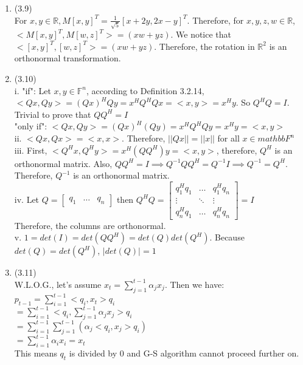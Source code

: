 \documentclass[letterpaper,12pt]{article}
\theoremstyle{definition}
\begin{document}
\begin{enumerate}
	
	\item(3.9)\\
	For $x, y \in  \mathbb{R}, M[x, y]^T = \frac{1}{\sqrt{5}}[x+2y, 2x-y]^T$. Therefore, for $x, y, z, w \in  \mathbb{R}$,  $<M[x, y]^T, M[w, z]^T> = (xw +yz)$. We notice that $<[x, y]^T,[w, z]^T> = (xw +yz) $. Therefore, the rotation in $\mathbb{R}^2$ is an orthonormal transformation.\\

	\item(3.10)\\
	i. "if": Let $x, y \in \mathbb{F}^{n}$, according to Definition 3.2.14, $<Qx, Qy> = (Qx)^{H}Qy = x^{H}Q^{H}Qx = <x, y> = x^{H}y$. So $Q^{H}Q = I$. Trivial to prove that $QQ^{H} = I$\\
	   "only if": $<Qx, Qy> = (Qx)^{H}(Qy) = x^{H}Q^{H}Qy = x^{H}y = <x, y>$\\
	ii. $<Qx, Qx> = <x,x>$. Therefore, $||Qx|| = ||x||$ for all $x \in mathbb{F}^{n}$\\
	iii. First, $<Q^{H}x, Q^{H}y> = x^{H}(QQ^{H})y = <x, y>$, therefore, $Q^{H}$ is an orthonormal matrix. Also, $QQ^{H} = I \implies Q^{-1}QQ^{H} = Q^{-1}I \implies Q^{-1} = Q^{H}$. Therefore, $Q^{-1}$ is an orthonormal matrix.\\
	iv. Let $Q = 
	\begin{bmatrix}
	    q_{1}  & \hdots & q_{n} 
	\end{bmatrix}$
	then $Q^{H}Q = 
	\begin{bmatrix}
	   q_{1}^{H}q_{1} & \hdots &  q_{1}^{H}q_{n} \\
	   \vdots & \ddots & \vdots \\
	   q_{n}^{H}q_{1} & \hdots &  q_{n}^{H}q_{n} 
	\end{bmatrix} = I$\\
	Therefore, the columns are orthonormal.\\
	v. $1 = det(I) = det(QQ^{H}) = det(Q)det(Q^{H})$. Because $det(Q) = det(Q^{H})$, $|det(Q)| = 1$\\

	
	\item(3.11)\\
	W.L.O.G., let's assume $x_{t} = \sum_{j = 1}^{t - 1}\alpha_{j}x_{j}$. Then we have:\\
	$p_{t - 1} = \sum_{i = 1 }^{t -1}<q_{i},x_{t}>q_{i}$\\
	$= \sum_{i = 1 }^{t -1}<q_{i}, \sum_{j = 1}^{t - 1}\alpha_{j}x_{j}>q_{i}$\\
	$= \sum_{i = 1 }^{t -1}\sum_{j = 1}^{t - 1}(\alpha_{j}<q_{i},x_{j}>q_{i})$\\
	$= \sum_{i = 1 }^{t -1}\alpha_{i}x_{i} = x_{t} $\\
	This means $q_{t}$ is divided by $0$ and G-S algorithm cannot proceed further on.\\


\end{enumerate}
\end{document}
